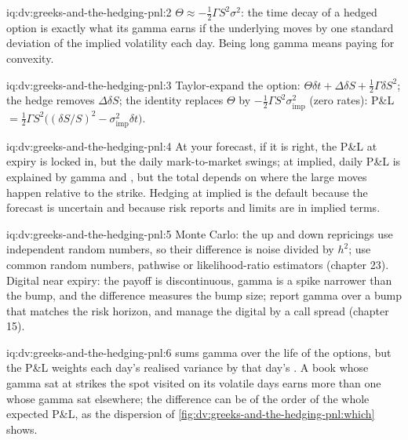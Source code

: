 \begin{solution}{iq:dv:greeks-and-the-hedging-pnl:2}
$\Theta\approx-\tfrac12\Gamma S^2\sigma^2$: the time decay of a hedged option is
exactly what its gamma earns if the underlying moves by one standard deviation of the
implied volatility each day. Being long gamma means paying  for convexity.
\end{solution}

\begin{solution}{iq:dv:greeks-and-the-hedging-pnl:3}
Taylor-expand the option: $\Theta\delta t+\Delta\delta S+\tfrac12\Gamma\delta S^2$; the
hedge removes $\Delta\delta S$; the identity replaces $\Theta$ by $-\tfrac12\Gamma S^2
\sigma_{\mathrm{imp}}^2$ (zero rates): P\&L $=\tfrac12\Gamma S^2\bigl((\delta S/S)^2-
\sigma_{\mathrm{imp}}^2\delta t\bigr)$.
\end{solution}

\begin{solution}{iq:dv:greeks-and-the-hedging-pnl:4}
At your forecast, if it is right, the P\&L at expiry is locked in, but the daily
mark-to-market swings; at implied, daily P\&L is explained by gamma and , but the
total depends on where the large moves happen relative to the strike. Hedging at
implied is the default because the forecast is uncertain and because risk reports
and limits are in implied terms.
\end{solution}

\begin{solution}{iq:dv:greeks-and-the-hedging-pnl:5}
Monte Carlo: the up and down repricings use independent random numbers, so their
difference is noise divided by $h^2$; use common random numbers, pathwise or
likelihood-ratio estimators (chapter 23). Digital near expiry: the payoff is
discontinuous, gamma is a spike narrower than the bump, and the difference measures
the bump size; report gamma over a bump that matches the risk horizon, and manage
the digital by a call spread (chapter 15).
\end{solution}

\begin{solution}{iq:dv:greeks-and-the-hedging-pnl:6}
 sums gamma over the life of the options, but the P\&L weights each day's realised
variance by that day's . A book whose gamma sat at strikes the spot visited
on its volatile days earns more than one whose gamma sat elsewhere; the difference can
be of the order of the whole expected P\&L, as the dispersion of
\cref{fig:dv:greeks-and-the-hedging-pnl:which} shows.
\end{solution}
